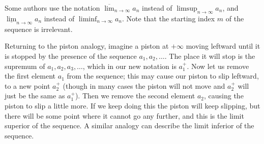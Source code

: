 \setcounter{thm}{10}
\begin{rmk}\label{i:6.4.11}
  Some authors use the notation \(\overline{\lim}_{n \to \infty} a_n\) instead of \(\limsup_{n \to \infty} a_n\), and \(\underline{\lim}_{n \to \infty} a_n\) instead of \(\liminf_{n \to \infty} a_n\).
  Note that the starting index \(m\) of the sequence is irrelevant.
\end{rmk}

\begin{note}
  Returning to the piston analogy, imagine a piston at \(+\infty\) moving leftward until it is stopped by the presence of the sequence \(a_1, a_2, \dots\).
  The place it will stop is the supremum of \(a_1, a_2, a_3, \dots\), which in our new notation is \(a_1^+\).
  Now let us remove the first element \(a_1\) from the sequence;
  this may cause our piston to slip leftward, to a new point \(a_2^+\)
  (though in many cases the piston will not move and \(a_2^+\) will just be the same as \(a_1^+\)).
  Then we remove the second element \(a_2\), causing the piston to slip a little more.
  If we keep doing this the piston will keep slipping, but there will be some point where it cannot go any further, and this is the limit superior of the sequence.
  A similar analogy can describe the limit inferior of the sequence.
\end{note}

